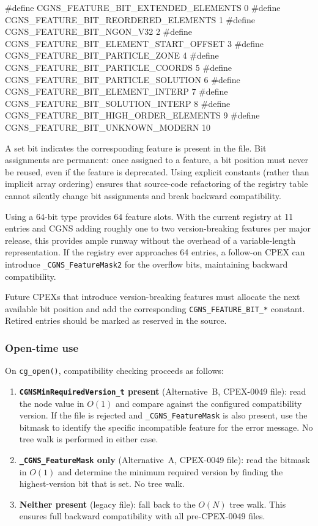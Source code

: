 \documentclass[11pt,letterpaper]{article}
\makeatletter
\let\cgns@orig@lstlisting\lstlisting
\let\cgns@endorig@lstlisting\endlstlisting
\renewenvironment{lstlisting}
  {\par\needspace{5\baselineskip}\nolinenumbers\cgns@orig@lstlisting}
  {\cgns@endorig@lstlisting\par\linenumbers}
\makeatother
\begin{document}
\begin{lstlisting}[language=C]
#define CGNS_FEATURE_BIT_EXTENDED_ELEMENTS     0
#define CGNS_FEATURE_BIT_REORDERED_ELEMENTS    1
#define CGNS_FEATURE_BIT_NGON_V32              2
#define CGNS_FEATURE_BIT_ELEMENT_START_OFFSET  3
#define CGNS_FEATURE_BIT_PARTICLE_ZONE         4
#define CGNS_FEATURE_BIT_PARTICLE_COORDS       5
#define CGNS_FEATURE_BIT_PARTICLE_SOLUTION     6
#define CGNS_FEATURE_BIT_ELEMENT_INTERP        7
#define CGNS_FEATURE_BIT_SOLUTION_INTERP       8
#define CGNS_FEATURE_BIT_HIGH_ORDER_ELEMENTS   9
#define CGNS_FEATURE_BIT_UNKNOWN_MODERN       10
\end{lstlisting}

A set bit indicates the corresponding feature is present in the file.
Bit assignments are permanent: once assigned to a feature, a bit
position must never be reused, even if the feature is deprecated.
Using explicit constants (rather than implicit array ordering) ensures
that source-code refactoring of the registry table cannot silently
change bit assignments and break backward compatibility.

Using a 64-bit type provides 64 feature slots.  With the current
registry at 11 entries and CGNS adding roughly one to two
version-breaking features per major release, this provides ample
runway without the overhead of a variable-length representation.
If the registry ever approaches 64 entries, a follow-on CPEX can
introduce \texttt{\_CGNS\_FeatureMask2} for the overflow bits,
maintaining backward compatibility.

Future CPEXs that introduce version-breaking features must allocate
the next available bit position and add the corresponding
\texttt{CGNS\_FEATURE\_BIT\_*} constant.  Retired entries should be
marked as reserved in the source.

\subsubsection{Open-time use}

On \texttt{cg\_open()}, compatibility checking proceeds as follows:

\begin{enumerate}[leftmargin=2em]
\item \textbf{\texttt{CGNSMinRequiredVersion\_t} present}
  (Alternative~B, CPEX-0049 file): read the node value in $O(1)$
  and compare against the configured compatibility version.  If the file is
  rejected and \texttt{\_CGNS\_FeatureMask} is also present, use
  the bitmask to identify the specific incompatible feature for the
  error message.  No tree walk is performed in either case.
\item \textbf{\texttt{\_CGNS\_FeatureMask} only}
  (Alternative~A, CPEX-0049 file): read the bitmask in $O(1)$
  and determine the minimum required version by finding the
  highest-version bit that is set.  No tree walk.
\item \textbf{Neither present} (legacy file):
  fall back to the $O(N)$ tree walk.  This ensures full backward
  compatibility with all pre-CPEX-0049 files.
\end{enumerate}
\end{document}
